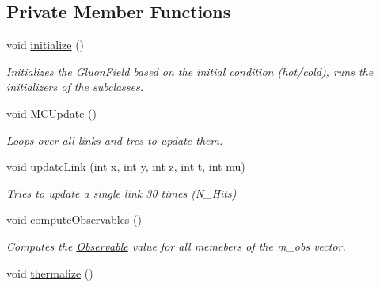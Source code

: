 \subsection*{Private Member Functions}
\begin{DoxyCompactItemize}
\item 
void \hyperlink{classGaugeFieldFactory_a3b7b0bc33811c149c85b595f5c724ddb}{initialize} ()\hypertarget{classGaugeFieldFactory_a3b7b0bc33811c149c85b595f5c724ddb}{}\label{classGaugeFieldFactory_a3b7b0bc33811c149c85b595f5c724ddb}

\begin{DoxyCompactList}\small\item\em Initializes the Gluon\+Field based on the initial condition (hot/cold), runs the initializers of the subclasses. \end{DoxyCompactList}\item 
void \hyperlink{classGaugeFieldFactory_a23a45078029941f5e5dd2d699935d38b}{M\+C\+Update} ()\hypertarget{classGaugeFieldFactory_a23a45078029941f5e5dd2d699935d38b}{}\label{classGaugeFieldFactory_a23a45078029941f5e5dd2d699935d38b}

\begin{DoxyCompactList}\small\item\em Loops over all links and tres to update them. \end{DoxyCompactList}\item 
void \hyperlink{classGaugeFieldFactory_ac58103157c9d39daa4819e2f9e8b7024}{update\+Link} (int x, int y, int z, int t, int mu)\hypertarget{classGaugeFieldFactory_ac58103157c9d39daa4819e2f9e8b7024}{}\label{classGaugeFieldFactory_ac58103157c9d39daa4819e2f9e8b7024}

\begin{DoxyCompactList}\small\item\em Tries to update a single link 30 times (N\+\_\+\+Hits) \end{DoxyCompactList}\item 
void \hyperlink{classGaugeFieldFactory_a70fc0cc23088b190f35c56885762812a}{compute\+Observables} ()\hypertarget{classGaugeFieldFactory_a70fc0cc23088b190f35c56885762812a}{}\label{classGaugeFieldFactory_a70fc0cc23088b190f35c56885762812a}

\begin{DoxyCompactList}\small\item\em Computes the \hyperlink{classObservable}{Observable} value for all memebers of the m\+\_\+obs vector. \end{DoxyCompactList}\item 
void \hyperlink{classGaugeFieldFactory_a18bc263a1dac26f0147063c33e33a518}{thermalize} ()\hypertarget{classGaugeFieldFactory_a18bc263a1dac26f0147063c33e33a518}{}\label{classGaugeFieldFactory_a18bc263a1dac26f0147063c33e33a518}


\end{DoxyCompactItemize}
